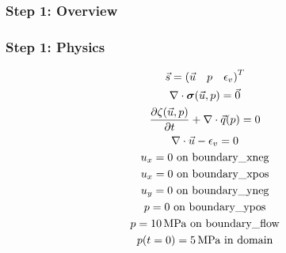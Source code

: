 \documentclass[aspectratio=169]{beamer}
\begin{document}
\begin{frame}
  \frametitle{Step 1: Overview}

      
\end{frame}


\begin{frame}
  \frametitle{Step 1: Physics}
  \summary{}

  \begin{minipage}{0.35\textwidth}
    {\scriptsize
      \begin{gather*}
        \vec{s} = \left(\vec{u} \quad p \quad \epsilon_v\right)^T \\
        \nabla \cdot \boldsymbol{\sigma}(\vec{u},p) = \vec{0} \\
        \frac{\partial \zeta(\vec{u},p)}{\partial t} + \nabla \cdot \vec{q}(p) = 0 \\
        \nabla \cdot \vec{u} - \epsilon_{v} = 0 \\
        u_x = 0 \text{ on boundary\_xneg} \\
        u_x = 0 \text{ on boundary\_xpos} \\
        u_y = 0 \text{ on boundary\_yneg} \\
        p = 0 \text{ on boundary\_ypos} \\
        p = 10 \text{\,MPa on boundary\_flow} \\
        p(t=0) = 5 \text{\,MPa  in domain}
    \end{gather*}}
  \end{minipage}
  \hfill
  \begin{minipage}{0.55\textwidth}
  \end{minipage}
      
\end{frame}
\end{document}
